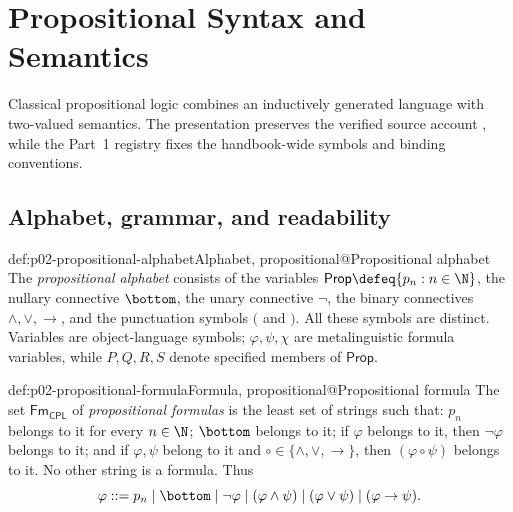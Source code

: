 
\chapter{Propositional Syntax and Semantics}
\label{sec:p02-propositional-syntax-semantics}

Classical propositional logic combines an inductively generated language with
two-valued semantics.  The presentation preserves the verified source account
\cite{EbbinghausFlumThomas1994,OpenLogic2026}, while the Part~1 registry fixes
the handbook-wide symbols and binding conventions.

\section{Alphabet, grammar, and readability}
\label{sec:p02-propositional-grammar}

\begin{hbdefinition}{def:p02-propositional-alphabet}{Alphabet, propositional@Propositional alphabet}
The \emph{propositional alphabet} consists of
the variables \(\mathsf{Prop}\defeq\{p_n:n\in\N\}\), the nullary connective
\(\bottom\), the unary connective \(\neg\), the binary connectives
\(\land,\lor,\to\), and the punctuation symbols \((\) and \()\).  All these
symbols are distinct.  Variables are object-language symbols;
\(\varphi,\psi,\chi\) are metalinguistic formula variables, while
\(P,Q,R,S\) denote specified members of \(\mathsf{Prop}\).
\end{hbdefinition}

\begin{hbdefinition}{def:p02-propositional-formula}{Formula, propositional@Propositional formula}
The set \(\mathsf{Fm}_{\mathsf{CPL}}\) of \emph{propositional formulas} is
the least set of strings such that: \(p_n\) belongs to it for every
\(n\in\N\); \(\bottom\) belongs to it; if \(\varphi\) belongs to it, then
\(\neg\varphi\) belongs to it; and if \(\varphi,\psi\) belong to it and
\(\circ\in\{\land,\lor,\to\}\), then
\((\varphi\circ\psi)\) belongs to it.  No other string is a formula.  Thus
\[
 \varphi ::= p_n\mid\bottom\mid\neg\varphi
 \mid(\varphi\land\psi)\mid(\varphi\lor\psi)
 \mid(\varphi\to\psi).
\]
\end{hbdefinition}

